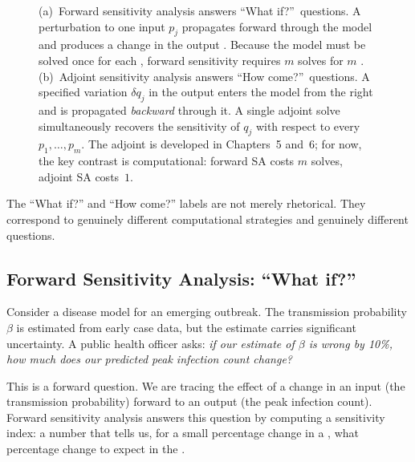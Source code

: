 \begin{figure}[htb]
\begin{center}
  \end{center}
  \caption{(a)~Forward sensitivity analysis answers ``What if?''\ questions.
           A perturbation to one input \POI $p_j$ propagates forward through
           the model and produces a change in the output \QOI\@.
           Because the model must be solved once for each \POI, forward
           sensitivity requires $m$ solves for $m$ \POIs.
           (b)~Adjoint sensitivity analysis answers ``How come?''\ questions.
           A specified variation $\delta q_j$ in the output \QOI enters the
           model from the right and is propagated \emph{backward} through it.
           A single adjoint solve simultaneously recovers the sensitivity of
           $q_j$ with respect to every \POI $p_1, \ldots, p_m$.
           The adjoint is developed in Chapters~5 and~6; for now, the key
           contrast is computational: forward SA costs $m$ solves,
           adjoint SA costs~$1$.}
  \label{fig:forwardadjoint}
\end{figure}

The ``What if?'' and ``How come?'' labels are not merely rhetorical.
They correspond to genuinely different computational strategies
and genuinely different questions.

\subsection{Forward Sensitivity Analysis: ``What if?''}

Consider a disease model for an emerging outbreak.
The transmission probability $\beta$ is estimated from early case data,
but the estimate carries significant uncertainty. A public health officer
asks: \emph{if our estimate of $\beta$ is wrong by 10\%, how much
does our predicted peak infection count change?}

This is a forward question. We are tracing the effect of a change
in an input \POI (the transmission probability) forward to an
output \QOI (the peak infection count). Forward sensitivity analysis
answers this question by computing a sensitivity index: a number that
tells us, for a small percentage change in a \POI, what percentage
change to expect in the \QOI.


